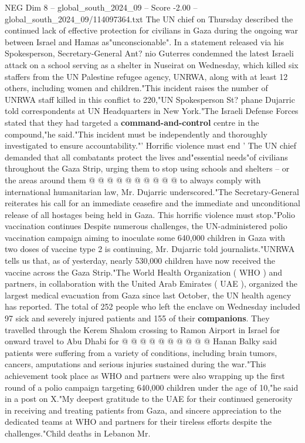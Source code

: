 \begin{textsample}{NEG Dim 8 – global\_south\_2024\_09 – Score -2.00 – global\_south\_2024\_09/114097364.txt}  \label{ex:f8_neg_202}
The UN chief on Thursday described the continued lack of effective protection for civilians in Gaza during the ongoing war between Israel and Hamas as"unconscionable".
In a statement released via his Spokesperson, Secretary-General Ant? nio Guterres condemned the latest Israeli attack on a school serving as a shelter in Nuseirat on Wednesday, which killed six staffers from the UN Palestine refugee agency, UNRWA, along with at least 12 others, including women and children."This incident raises the number of UNRWA staff killed in this conflict to 220,"UN Spokesperson St? phane Dujarric told correspondents at UN Headquarters in New York."The Israeli Defense Forces stated that they had targeted a \textbf{command-and-control} centre in the compound,"he said."This incident must be independently and thoroughly investigated to ensure accountability."' Horrific violence must end ' The UN chief demanded that all combatants protect the lives and"essential needs"of civilians throughout the Gaza Strip, urging them to stop using schools and shelters -- or the areas around them @ @ @ @ @ @ @ @ @ @ to always comply with international humanitarian law, Mr.
Dujarric underscored."The Secretary-General reiterates his call for an immediate ceasefire and the immediate and unconditional release of all hostages being held in Gaza.
This horrific violence must stop."Polio vaccination continues Despite numerous challenges, the UN-administered polio vaccination campaign aiming to inoculate some 640,000 children in Gaza with two doses of vaccine type 2 is continuing, Mr.
Dujarric told journalists."UNRWA tells us that, as of yesterday, nearly 530,000 children have now received the vaccine across the Gaza Strip."The World Health Organization ( WHO ) and partners, in collaboration with the United Arab Emirates ( UAE ), organized the largest medical evacuation from Gaza since last October, the UN health agency has reported.
The total of 252 people who left the enclave on Wednesday included 97 sick and severely injured patients and 155 of their \textbf{companions}.
They travelled through the Kerem Shalom crossing to Ramon Airport in Israel for onward travel to Abu Dhabi for @ @ @ @ @ @ @ @ @ @ Hanan Balky said patients were suffering from a variety of conditions, including brain tumors, cancers, amputations and serious injuries sustained during the war."This achievement took place as WHO and partners were also wrapping up the first round of a polio campaign targeting 640,000 children under the age of 10,"he said in a post on X."My deepest gratitude to the UAE for their continued generosity in receiving and treating patients from Gaza, and sincere appreciation to the dedicated teams at WHO and partners for their tireless efforts despite the challenges."Child deaths in Lebanon Mr.

\end{textsample}
